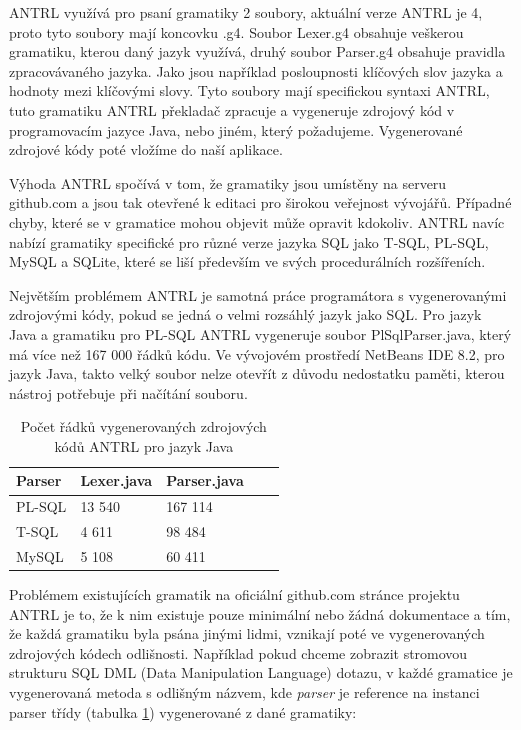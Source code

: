\documentclass[czech,bachelor,public,dept460,male,cpdeclaration,twoside]{diploma}
\begin{document}
ANTRL využívá pro psaní gramatiky 2 soubory, aktuální verze ANTRL je 4, proto tyto soubory mají koncovku .g4. Soubor Lexer.g4 obsahuje veškerou gramatiku, kterou daný jazyk využívá, druhý soubor Parser.g4 obsahuje pravidla zpracovávaného jazyka. Jako jsou například posloupnosti klíčových slov jazyka a hodnoty mezi klíčovými slovy. Tyto soubory mají specifickou syntaxi ANTRL, tuto gramatiku ANTRL překladač zpracuje a vygeneruje zdrojový kód v programovacím jazyce Java, nebo jiném, který požadujeme. Vygenerované zdrojové kódy poté vložíme do naší aplikace. \cite{antrldocs}



Výhoda ANTRL spočívá v tom, že gramatiky jsou umístěny na serveru github.com a jsou tak otevřené k editaci pro širokou veřejnost vývojářů. Případné chyby, které se v gramatice mohou objevit může opravit kdokoliv. ANTRL navíc nabízí gramatiky specifické pro různé verze jazyka SQL jako T-SQL, PL-SQL, MySQL a SQLite, které se liší především ve svých procedurálních rozšířeních. \cite{antrlg}



Největším problémem ANTRL je samotná práce programátora s vygenerovanými zdrojovými kódy, pokud se jedná o velmi rozsáhlý jazyk jako SQL. Pro jazyk Java a gramatiku pro PL-SQL ANTRL vygeneruje soubor PlSqlParser.java, který má více než 167 000 řádků kódu. Ve vývojovém prostředí NetBeans IDE 8.2, pro jazyk Java, takto velký soubor nelze otevřít z důvodu nedostatku paměti, kterou nástroj potřebuje při načítání souboru.

\begin{table}[!htbp]
	\centering
	\caption{Počet řádků vygenerovaných zdrojových kódů ANTRL pro jazyk Java}
	\label{tab:parsers}
	\begin{tabular}{lllll}
		\toprule
		Parser & Lexer.java & Parser.java\\
		\midrule
		PL-SQL & 13 540 & 167 114 \\
        T-SQL & 4 611 & 98 484 \\
        MySQL & 5 108 & 60 411 \\
		\midrule
	\end{tabular}
\end{table}


Problémem existujících gramatik na oficiální github.com stránce projektu ANTRL je to, že k nim existuje pouze minimální nebo žádná dokumentace a tím, že každá gramatiku byla psána jinými lidmi, vznikají poté ve vygenerovaných zdrojových kódech odlišnosti. Například pokud chceme zobrazit stromovou strukturu SQL DML (Data Manipulation Language) dotazu, v každé gramatice je vygenerovaná metoda s odlišným názvem, kde \textit{parser} je reference na instanci parser třídy (tabulka \ref{tab:parsers}) vygenerované z dané gramatiky:\newline
\end{document}

